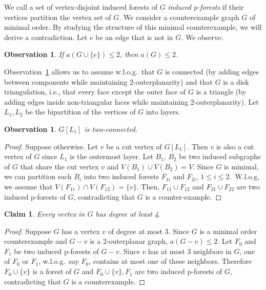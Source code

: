 \documentclass[11pt]{article}
\newtheorem{claim}[theorem]{Claim}
\newtheorem{observation}[theorem]{Observation}
\begin{document}
We call a set of vertex-disjoint induced forests of $G$ \emph{induced p-forests} if their vertices partition the vertex set of $G$. We consider a counterexample graph $G$ of minimal order. By studying the structure of this minimal counterexample, we will derive a contradiction. Let $e$ be an edge that is not in $G$. We observe:

\begin{observation} \label{obs:disk-tri}
If $a(G\cup \{e\}) \leq 2$, then $a(G) \leq 2$.
\end{observation}

Observation~\ref{obs:disk-tri} allows us to assume w.l.o.g.\ that $G$ is connected (by adding edges between components while maintaining 2-outerplanarity) and that $G$ is a disk triangulation, i.e., that every face except the outer face of $G$ is a triangle (by adding edges inside non-triangular faces while maintaining 2-outerplanarity). Let $L_1, L_2$ be the bipartition of the vertices of $G$ into layers.

\begin{observation} \label{obs:L1-2-connected}
$G[L_1]$ is two-connected.
\end{observation}
\begin{proof}
Suppose otherwise. Let $v$ be a cut vertex of $G[L_1]$. Then $v$ is also a cut vertex of $G$ since $L_1$ is the outermost layer. Let $B_1$, $B_2$ be two induced subgraphs of $G$ that share the cut vertex $v$ and $V(B_1) \cup V(B_2) = V$. Since $G$ is minimal, we can partition each $B_i$ into two induced forests $F_{1i}$ and $F_{2i}$, $1 \leq i \leq 2$.~W.l.o.g, we assume that $V(F_{11})\cap V(F_{12}) = \{v\}$. Then, $F_{11} \cup F_{12}$ and $F_{21} \cup F_{22}$ are two induced p-forests of $G$, contradicting that $G$ is a counter-example.      
\end{proof}


\begin{claim} \label{clm:no-deg-3}
Every vertex in $G$ has degree at least 4.
\end{claim}
\begin{proof}
Suppose $G$ has a vertex $v$ of degree at most 3.  Since $G$ is a minimal order counterexample and $G - v$ is a 2-outerplanar graph,  $a(G- v) \leq 2$.  Let $F_0$ and $F_1$ be two induced p-forests of $G- v$.  Since $v$ has at most 3 neighbors in $G$, one of $F_0$ or $F_1$, w.l.o.g.\ say $F_0$, contains at most one of these neighbors.  Therefore $F_0 \cup \{v\}$ is a forest of $G$ and $F_0 \cup \{v\}, F_1$ are two induced p-forests of $G$, contradicting that $G$ is a counterexample.
\end{proof}
\end{document}
